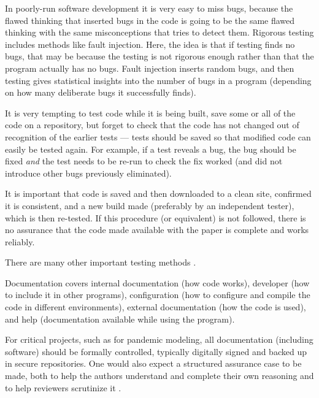 \documentclass[10pt,a4paper]{article}
\begin{document}
In poorly-run software development it is very easy to miss bugs, because the flawed thinking that inserted bugs in the code is going to be the same flawed thinking with the same misconceptions that tries to detect them. Rigorous testing includes methods like fault injection. Here, the idea is that if testing finds no bugs, that may be because the testing is not rigorous enough rather than that the program actually has no bugs. Fault injection inserts random bugs, and then testing gives statistical insights into the number of bugs in a program (depending on how many deliberate bugs it successfully finds). 

It is very tempting to test code while it is being built, save some or all of the code on a repository, but forget to check that the code has not changed out of recognition of the earlier tests --- tests should be saved so that modified code can easily be tested again. For example, if a test reveals a bug, the bug should be fixed \emph{and\/} the test needs to be re-run to check the fix worked (and did not introduce other bugs previously eliminated). 

It is important that code is saved and then downloaded to a clean site, confirmed it is consistent, and a new build made (preferably by an independent tester), which is then re-tested. If this procedure (or equivalent) is not followed, there is no assurance that the code made available with the paper is complete and works reliably.

There are many other important testing methods \cite{sommerville,knight,NVP}.

Documentation covers internal documentation (how code works), developer (how to include it in other programs), configuration (how to configure and compile the code in different environments), external documentation (how the code is used), and help (documentation available while using the program). 

{For critical projects, such as for pandemic modeling, all documentation (including software) should be formally controlled, typically digitally signed and backed up in secure repositories. One would also expect a structured assurance case to be made, both to help the authors understand and complete their own reasoning and to help reviewers scrutinize it \cite{assurance-case}.
}
\end{document}
